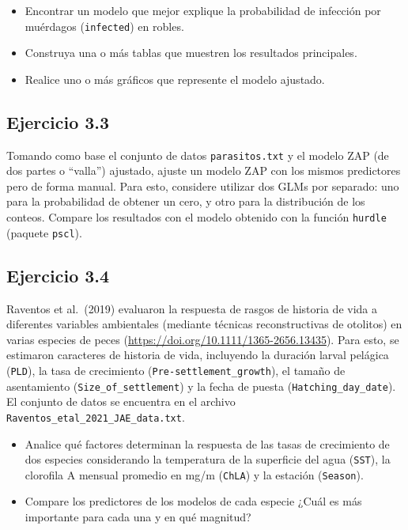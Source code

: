 \documentclass[
]{book}
\begin{document}
\begin{itemize}
\item
  Encontrar un modelo que mejor explique la probabilidad de infección por muérdagos (\texttt{infected}) en robles.
\item
  Construya una o más tablas que muestren los resultados principales.
\item
  Realice uno o más gráficos que represente el modelo ajustado.
\end{itemize}

\hypertarget{ejercicio-3.3}{%
\subsection{Ejercicio 3.3}\label{ejercicio-3.3}}

Tomando como base el conjunto de datos \texttt{parasitos.txt} y el modelo ZAP (de dos partes o ``valla'') ajustado, ajuste un modelo ZAP con los mismos predictores pero de forma manual. Para esto, considere utilizar dos GLMs por separado: uno para la probabilidad de obtener un cero, y otro para la distribución de los conteos. Compare los resultados con el modelo obtenido con la función \texttt{hurdle} (paquete \texttt{pscl}).

\hypertarget{ejercicio-3.4}{%
\subsection{Ejercicio 3.4}\label{ejercicio-3.4}}

Raventos et al.~(2019) evaluaron la respuesta de rasgos de historia de vida a diferentes variables ambientales (mediante técnicas reconstructivas de otolitos) en varias especies de peces (\url{https://doi.org/10.1111/1365-2656.13435}). Para esto, se estimaron caracteres de historia de vida, incluyendo la duración larval pelágica (\texttt{PLD}), la tasa de crecimiento (\texttt{Pre-settlement\_growth}), el tamaño de asentamiento (\texttt{Size\_of\_settlement}) y la fecha de puesta (\texttt{Hatching\_day\_date}). El conjunto de datos se encuentra en el archivo \texttt{Raventos\_etal\_2021\_JAE\_data.txt}.

\begin{itemize}
\item
  Analice qué factores determinan la respuesta de las tasas de crecimiento de dos especies considerando la temperatura de la superficie del agua (\texttt{SST}), la clorofila A mensual promedio en mg/m (\texttt{ChLA}) y la estación (\texttt{Season}).
\item
  Compare los predictores de los modelos de cada especie ¿Cuál es más importante para cada una y en qué magnitud?
\end{itemize}
\end{document}
